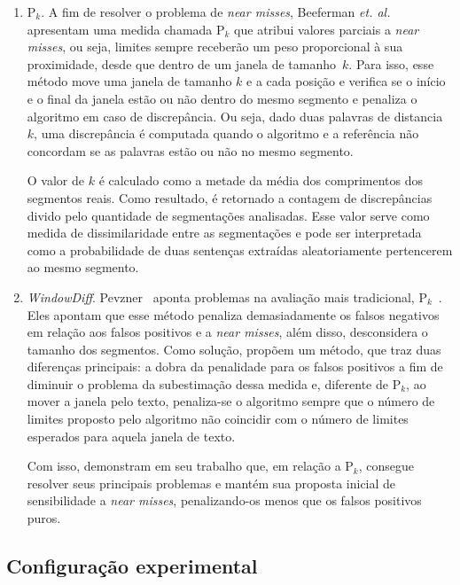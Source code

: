 \begin{enumerate}

	\item P$_k$. A fim de resolver o problema de \textit{near misses}, Beeferman \textit{et. al.}~\cite{Beeferman1999} apresentam uma medida chamada P$_k$ que atribui 
%
valores parciais a \textit{near misses}, 
%
ou seja, limites sempre receberão um peso proporcional à sua proximidade, desde que dentro de um janela de tamanho~$k$.
%
Para isso, esse método move uma janela de tamanho $k$ e a cada posição e verifica se o início e o final da janela estão ou não dentro do mesmo segmento e penaliza o algoritmo em caso de discrepância. Ou seja, dado duas palavras de distancia $k$, uma discrepância é computada quando o algoritmo e a referência não concordam se as palavras estão ou não no mesmo segmento.

O valor de $k$ é calculado como a metade da média dos comprimentos dos segmentos reais. Como resultado, é retornado a contagem de discrepâncias divido pelo quantidade de segmentações analisadas. Esse valor serve como medida de dissimilaridade entre as segmentações e pode ser interpretada como a probabilidade de duas sentenças extraídas aleatoriamente pertencerem ao mesmo segmento.

\item \textit{WindowDiff}. Pevzner~\cite{Pevzner2002} aponta problemas na avaliação mais tradicional, P$_k$~\cite{Beeferman1999}. Eles apontam que esse método penaliza demasiadamente os falsos negativos em relação aos falsos positivos e a \textit{near misses}, além disso, desconsidera o tamanho dos segmentos. Como solução, propõem um método, que traz duas diferenças principais: a dobra da penalidade para os falsos positivos a fim de diminuir o problema da subestimação dessa medida e, diferente de P$_k$, ao mover a janela pelo texto, penaliza-se o algoritmo sempre que o número de limites proposto pelo algoritmo não coincidir com o número de limites esperados para aquela janela de texto. 

Com isso, demonstram em seu trabalho que, em relação a P$_k$, consegue resolver seus principais problemas e mantém sua proposta inicial de sensibilidade a \textit{near misses}, penalizando-os menos que os falsos positivos puros.


\end{enumerate}

\subsection{Configuração experimental}
	\label{subsec:configuracaoexperimental}

